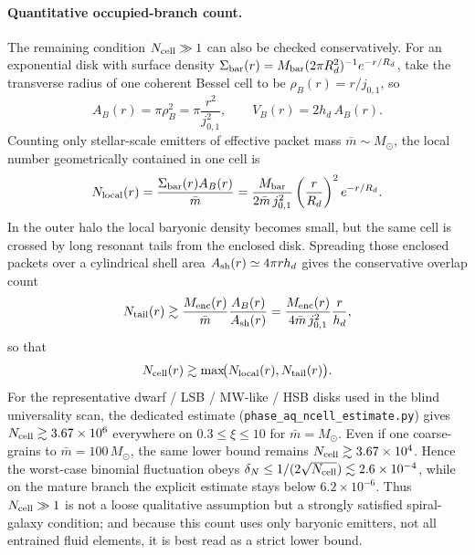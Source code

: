 \documentclass[11pt]{article}
\begin{document}
\paragraph{Quantitative occupied-branch count.}
The remaining condition $N_{\rm cell}\gg1$ can also be checked
conservatively.  For an exponential disk with surface density
\(
\Sigma_{\rm bar}(r)=M_{\rm bar}(2\pi R_d^2)^{-1}e^{-r/R_d}
\),
take the transverse radius of one coherent Bessel cell to be
\(
\rho_B(r)=r/j_{0,1}
\),
so
\begin{equation}
A_B(r)=\pi \rho_B^2=\pi\frac{r^2}{j_{0,1}^2},
\qquad
V_B(r)=2h_d\,A_B(r).
\label{eq:bessel_cell_volume}
\end{equation}
Counting only stellar-scale emitters of effective packet mass
\(\bar m\sim M_\odot\), the local number geometrically contained in one cell is
\begin{equation}
N_{\rm local}(r)
= \frac{\Sigma_{\rm bar}(r)A_B(r)}{\bar m}
= \frac{M_{\rm bar}}{2\bar m\,j_{0,1}^2}
\left(\frac{r}{R_d}\right)^2 e^{-r/R_d}.
\label{eq:ncell_local}
\end{equation}
In the outer halo the local baryonic density becomes small, but the same
cell is crossed by long resonant tails from the enclosed disk.  Spreading
those enclosed packets over a cylindrical shell area
\(
A_{\rm sh}(r)\simeq4\pi r h_d
\)
gives the conservative overlap count
\begin{equation}
N_{\rm tail}(r)
\gtrsim \frac{M_{\rm enc}(r)}{\bar m}\frac{A_B(r)}{A_{\rm sh}(r)}
= \frac{M_{\rm enc}(r)}{4\bar m\,j_{0,1}^2}\frac{r}{h_d},
\label{eq:ncell_tail}
\end{equation}
so that
\begin{equation}
N_{\rm cell}(r)\gtrsim
\max\!\bigl(N_{\rm local}(r),N_{\rm tail}(r)\bigr).
\label{eq:ncell_lower_bound}
\end{equation}
For the representative dwarf / LSB / MW-like / HSB disks used in the
blind universality scan, the dedicated estimate
(\texttt{phase\_aq\_ncell\_estimate.py}) gives
\(
N_{\rm cell}\gtrsim3.67\times10^6
\)
everywhere on \(0.3\le\xi\le10\) for \(\bar m=M_\odot\).  Even if one
coarse-grains to \(\bar m=100\,M_\odot\), the same lower bound remains
\(
N_{\rm cell}\gtrsim3.67\times10^4
\).
Hence the worst-case binomial fluctuation obeys
\(
\delta_N\le1/(2\sqrt{N_{\rm cell}})\lesssim2.6\times10^{-4}
\),
while on the mature branch the explicit estimate stays below
\(
6.2\times10^{-6}
\).
Thus $N_{\rm cell}\gg1$ is not a loose qualitative assumption but a
strongly satisfied spiral-galaxy condition; and because this count uses
only baryonic emitters, not all entrained fluid elements, it is best read
as a strict lower bound.
\end{document}
